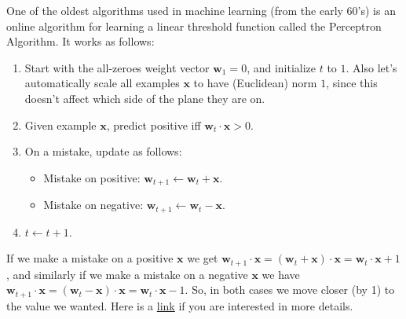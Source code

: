 \documentclass{article}
\begin{document}
\begin{bprob}
    One of the oldest algorithms used in machine learning (from the early 60's) is an online algorithm for learning a linear threshold function called the Perceptron Algorithm.
    It works as follows:
    \begin{enumerate}[label=\arabic*.]
        \item Start with the all-zeroes weight vector $\mathbf{w}_1 = 0$, and initialize $t$ to $1$. Also let's automatically scale all examples $\mathbf{x}$ to have (Euclidean) norm $1$, since this doesn't affect which side of the plane they are on.
        \item Given example $\mathbf{x}$, predict positive iff $\mathbf{w}_t \cdot \mathbf{x} > 0$.
        \item On a mistake, update as follows:
        \begin{itemize}
            \item Mistake on positive: $\mathbf{w}_{t+1} \leftarrow \mathbf{w}_t + \mathbf{x}$. 
            \item Mistake on negative: $\mathbf{w}_{t+1} \leftarrow \mathbf{w}_t - \mathbf{x}$.
        \end{itemize}
        \item $t \leftarrow t + 1$.
    \end{enumerate}
    If we make a mistake on a positive $\mathbf{x}$ we get $\mathbf{w}_{t + 1} \cdot \mathbf{x} = (\mathbf{w}_{t} + \mathbf{x}) \cdot \mathbf{x} = \mathbf{w}_{t} \cdot \mathbf{x} + 1$, and similarly if we make a mistake on a negative $\mathbf{x}$ we have $\mathbf{w}_{t + 1} \cdot \mathbf{x} = (\mathbf{w}_{t} - \mathbf{x}) \cdot \mathbf{x} = \mathbf{w}_{t} \cdot \mathbf{x} - 1$. So, in both cases we move closer (by 1) to the value we wanted. Here is a \href{https://en.wikipedia.org/wiki/Perceptron}{link} if you are interested in more details.\\
    

\end{bprob}
\end{document}
